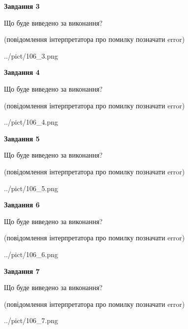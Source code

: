 \documentclass[12pt, ukrainian]{article}
\begin{document}
{\begin {large}
{\begin {center}\textbf{Завдання 3}\end {center}}\par
Що буде виведено за виконання?\par
 (повідомлення інтерпретатора про помилку позначати error)\par
\begin{center}
	{../pict/106_3.png}
\end{center}
\newpage

{\begin {center}\textbf{Завдання 4}\end {center}}\par
Що буде виведено за виконання?\par
 (повідомлення інтерпретатора про помилку позначати error)\par
\begin{center}
	{../pict/106_4.png}
\end{center}
\newpage

{\begin {center}\textbf{Завдання 5}\end {center}}\par
Що буде виведено за виконання?\par
 (повідомлення інтерпретатора про помилку позначати error)\par
\begin{center}
	{../pict/106_5.png}
\end{center}
\newpage

{\begin {center}\textbf{Завдання 6}\end {center}}\par
Що буде виведено за виконання?\par
 (повідомлення інтерпретатора про помилку позначати error)\par
\begin{center}
	{../pict/106_6.png}
\end{center}
\newpage

{\begin {center}\textbf{Завдання 7}\end {center}}\par
Що буде виведено за виконання?\par
 (повідомлення інтерпретатора про помилку позначати error)\par
\begin{center}
	{../pict/106_7.png}
\end{center}
\newpage


\end{large}}
\end{document}
